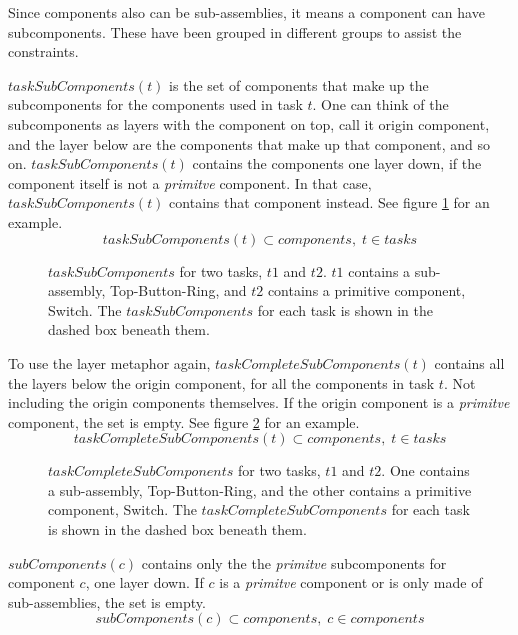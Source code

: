   \noindent Since components also can be sub-assemblies, it means a component can have subcomponents. These have been grouped in different groups to assist the constraints.

  $taskSubComponents(t)$ is the set of components that make up the subcomponents for the components used in task $t$. One can think of the subcomponents as layers with the component on top, call it origin component, and the layer below are the components that make up that component, and so on. $taskSubComponents(t)$ contains the components one layer down, if the component itself is not a \emph{primitve} component. In that case, $taskSubComponents(t)$ contains that component instead. See figure \ref{fig:taskSubComponents} for an example.
 \begin{equation}\label{eq:53}
 taskSubComponents(t) \subset components, \; t \in tasks
 \end{equation}

 \begin{figure}
 
 \caption{$taskSubComponents$ for two tasks, $t1$ and $t2$. $t1$ contains a sub-assembly, Top-Button-Ring, and $t2$ contains a primitive component, Switch. The $taskSubComponents$ for each task is shown in the dashed box beneath them.}
 \label{fig:taskSubComponents}
 \end{figure}
 
 \noindent To use the layer metaphor again, $taskCompleteSubComponents(t)$ contains all the layers below the origin component, for all the components in task $t$. Not including the origin components themselves. If the origin component is a \emph{primitve} component, the set is empty. See figure \ref{fig:taskCompleteSubComponents} for an example.
 \begin{equation}\label{eq:54}
 taskCompleteSubComponents(t) \subset components, \; t \in tasks
 \end{equation}
 
  \begin{figure}
  
  \caption{$taskCompleteSubComponents$ for two tasks, $t1$ and $t2$. One contains a sub-assembly, Top-Button-Ring, and the other contains a primitive component, Switch. The $taskCompleteSubComponents$ for each task is shown in the dashed box beneath them.}
  \label{fig:taskCompleteSubComponents}
  \end{figure}
 
  \noindent $subComponents(c)$ contains only the the \emph{primitve} subcomponents for component $c$, one layer down. If $c$ is a \emph{primitve} component or is only made of sub-assemblies, the set is empty.
 \begin{equation}\label{eq:55}
 subComponents(c) \subset components, \; c \in components
 \end{equation}

